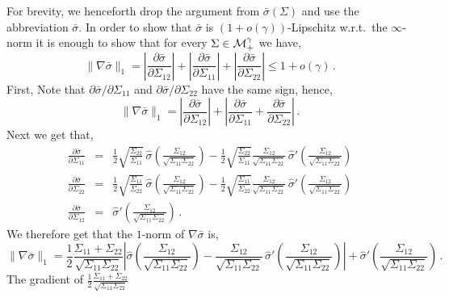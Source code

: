 For brevity, we henceforth drop the argument from $\bar{\sigma}(\Sigma)$ and
use the abbreviation $\bar{\sigma}$. In order to show that $\bar\sigma$ is
$(1+o(\gamma))$-Lipschitz w.r.t.\ the $\infty$-norm it is enough to show that
for every $\Sigma\in{\cal M}_+^\gamma$ we have,
\begin{equation}\label{eq:grad_l1_bound}
\|\nabla \bar \sigma\|_1 =
	\left|\frac{\partial \bar\sigma}{\partial \Sigma_{12}}\right| +
	\left|\frac{\partial \bar\sigma}{\partial \Sigma_{11}}\right| +
	\left|\frac{\partial \bar\sigma}{\partial \Sigma_{22}}\right|\le
		1+o(\gamma) \,.
\end{equation}
First, Note that ${\partial \bar\sigma}/{\partial \Sigma_{11}}$ and
${\partial \bar\sigma}/{\partial \Sigma_{22}}$ have the same sign,
hence,
$$\|\nabla \bar \sigma\|_1 =
	\left|\frac{\partial \bar\sigma} {\partial \Sigma_{12}}\right| +
	\left|\frac{\partial \bar\sigma}{\partial \Sigma_{11}} +
				\frac{\partial \bar\sigma}{\partial \Sigma_{22}}\right| \,.$$
Next we get that,
\begin{eqnarray*}
\frac{\partial \bar\sigma}{\partial \Sigma_{11}} & = &
	\frac{1}{2}\sqrt{\frac{\Sigma_{22}}{\Sigma_{11}}}\,
	\hat\sigma\!\left(\frac{\Sigma_{12}}{\sqrt{\Sigma_{11}\Sigma_{22}}}\right) -
	\frac{1}{2}\sqrt{\frac{\Sigma_{22}}{\Sigma_{11}}}
		\frac{\Sigma_{12}}{\sqrt{\Sigma_{11}\Sigma_{22}}}\,
		\hat\sigma'\!\left(\frac{\Sigma_{12}}{\sqrt{\Sigma_{11}\Sigma_{22}}}\right)
\\
\frac{\partial \bar\sigma}{\partial \Sigma_{22}} & = &
	\frac{1}{2}\sqrt{\frac{\Sigma_{11}}{\Sigma_{22}}}\,
	\hat\sigma\!\left(\frac{\Sigma_{12}}{\sqrt{\Sigma_{11}\Sigma_{22}}}\right) -
	\frac{1}{2}\sqrt{\frac{\Sigma_{11}}{\Sigma_{22}}}
	\frac{\Sigma_{12}}{\sqrt{\Sigma_{11}\Sigma_{22}}}\,
	\hat\sigma'\!\left(\frac{\Sigma_{12}}{\sqrt{\Sigma_{11}\Sigma_{22}}}\right)
\\
\frac{\partial \bar\sigma}{\partial \Sigma_{12}} & = &
	\hat\sigma'\!\left(\frac{\Sigma_{12}}{\sqrt{\Sigma_{11}\Sigma_{22}}}\right)
	\, .
\end{eqnarray*}
We therefore get that the $1$-norm of $\nabla\bar\sigma$ is,
\[
\|\nabla \bar \sigma\|_1 =
\frac{1}{2}\frac{\Sigma_{11}+\Sigma_{22}}{\sqrt{\Sigma_{11}\Sigma_{22}}}
\left|
	\hat\sigma\!\left(\frac{\Sigma_{12}}{\sqrt{\Sigma_{11}\Sigma_{22}}}\right) -
	\frac{\Sigma_{12}}{\sqrt{\Sigma_{11}\Sigma_{22}}}\,
	\hat\sigma'\!\left(\frac{\Sigma_{12}}{\sqrt{\Sigma_{11}\Sigma_{22}}}\right)
\right| +
	\hat\sigma'\!\left(\frac{\Sigma_{12}}{\sqrt{\Sigma_{11}\Sigma_{22}}}\right)
	\,.
\]
The gradient of
$\frac{1}{2}\frac{\Sigma_{11}+\Sigma_{22}}{\sqrt{\Sigma_{11}\Sigma_{22}}}$
